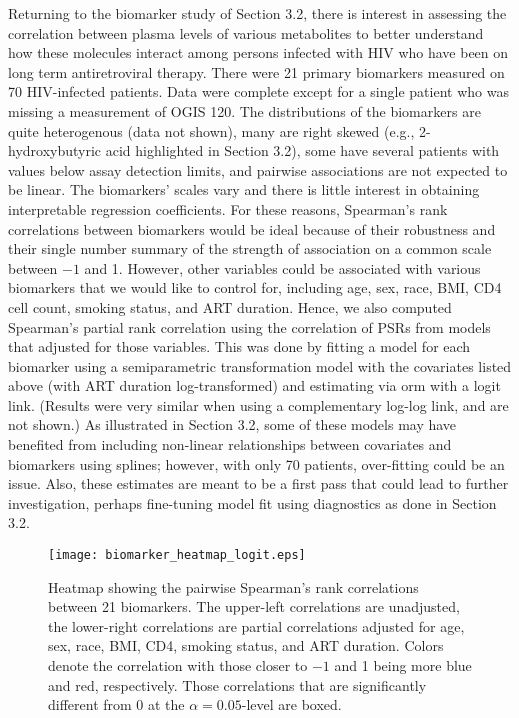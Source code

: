 \documentclass[12pt, usenatbib]{article}
\begin{document}
Returning to the biomarker study of Section 3.2, there is interest in assessing the correlation between plasma levels of various metabolites to better understand how these molecules interact among persons infected with HIV who have been on long term antiretroviral therapy.  There were 21 primary biomarkers measured on 70 HIV-infected patients.  Data were complete except for a single patient who was missing a measurement of OGIS 120.  The distributions of the biomarkers are quite heterogenous (data not shown), many are right skewed (e.g., 2-hydroxybutyric acid highlighted in Section 3.2), some have several patients with values below assay detection limits, and pairwise associations are not expected to be linear.  The biomarkers' scales vary and there is little interest in obtaining interpretable regression coefficients.  %
For these reasons, Spearman's rank correlations between biomarkers would be ideal because of their robustness and their single number summary of the strength of association on a common scale between $-1$ and 1.  However, other variables could be associated with various biomarkers that we would like to control for, including age, sex, race, BMI, CD4 cell count, smoking status, and ART duration.  Hence, we also computed Spearman's partial rank correlation using the correlation of PSRs from models that adjusted for those variables.  This was done by fitting a model for each biomarker using a semiparametric transformation model with the covariates listed above (with ART duration log-transformed) and estimating via orm with a logit link.  (Results were very similar when using a complementary log-log link, and are not shown.)  As illustrated in Section 3.2, some of these models may have benefited from including non-linear relationships between covariates and biomarkers using splines; however, with only 70 patients, over-fitting could be an issue.  Also, these estimates are meant to be a first pass that could lead to further investigation, perhaps fine-tuning model fit using diagnostics as done in Section 3.2.  

\begin{figure}
\texttt{[image: biomarker\_heatmap\_logit.eps]}
\caption{Heatmap showing the pairwise Spearman's rank correlations between 21 biomarkers.  The upper-left correlations are unadjusted, the lower-right correlations are partial correlations adjusted for age, sex, race, BMI, CD4, smoking status, and ART duration.  Colors denote the correlation with those closer to $-1$ and 1 being more blue and red, respectively.  Those correlations that are significantly different from 0 at the $\alpha=0.05$-level are boxed.}
\label{fig4}
\end{figure}  
\end{document}
